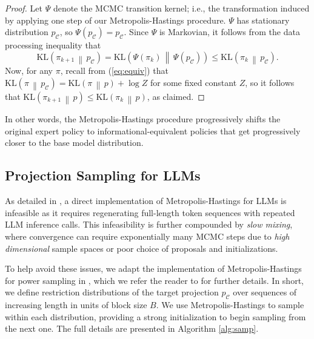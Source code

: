 \documentclass{article}
\begin{document}
\begin{proof}
    Let $\Psi$ denote the MCMC transition kernel; i.e., the transformation induced by applying one step of our Metropolis-Hastings procedure. $\Psi$ has stationary distribution $p_{\mathcal{C}}$, so $\Psi(p_{\mathcal{C}}) = p_{\mathcal{C}}$. Since $\Psi$ is Markovian, it follows from the data processing inequality that 
    \begin{equation}
        \mathrm{KL}\!\left(
        \pi_{k+1}
        \,\middle\|\,
        p_{\mathcal{C}}
    \right) = \mathrm{KL}\!\left(
        \Psi(\pi_k) 
        \,\middle\|\,
        \Psi(p_{\mathcal{C}})
    \right) \leq \mathrm{KL}\!\left(
        \pi_k
        \,\middle\|\,
        p_{\mathcal{C}}
    \right).
    \end{equation}
    Now, for any $\pi$, recall from (\ref{eq:equiv}) that $\mathrm{KL}\!\left(
        \pi
        \,\middle\|\,
        p_{\mathcal{C}}
    \right) = \mathrm{KL}\!\left(
        \pi
        \,\middle\|\,
        p
    \right) + \log Z$
for some fixed constant $Z$, so it follows that $\mathrm{KL}\!\left(
        \pi_{k+1}
        \,\middle\|\,
        p
    \right)  \leq \mathrm{KL}\!\left(
        \pi_k
        \,\middle\|\,
        p
    \right)$, as claimed.
\end{proof}

In other words, the Metropolis-Hastings procedure progressively shifts the original expert policy to informational-equivalent policies that get progressively closer to the base model distribution.   

\subsection{Projection Sampling for LLMs}\label{sec:prac}
As detailed in \cite{karan2025reasoning}, a direct implementation of Metropolis-Hastings for LLMs is infeasible as it requires regenerating full-length token sequences with repeated LLM inference calls. This infeasibility is further compounded by  \textit{slow mixing}, where convergence can require exponentially many MCMC steps due to  \textit{high dimensional} sample spaces or poor choice of proposals and initializations.

To help avoid these issues, we adapt the implementation of Metropolis-Hastings for power sampling in \cite{karan2025reasoning}, which we refer the reader to for further details. In short, we define restriction distributions of the target projection $p_{\mathcal{C}}$ over sequences of increasing length in units of block size $B$. We use Metropolis-Hastings to sample within each distribution, providing a strong initialization to begin sampling from the next one. The full details are presented in Algorithm \ref{alg:samp}. 
\end{document}
